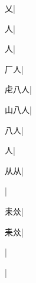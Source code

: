 \begin{multicols}{2}
{{乂}\mktsJzrVerticalBar{}{\cjk{}{\cnsym{}　}{\cnsym{}　}{\cnsym{}　}}|{}\par
{人}\mktsJzrVerticalBar{}{\cjk{}{\cnsym{}　}{\cnsym{}　}{\cnsym{}　}}|{}\par
{人}\mktsJzrVerticalBar{}{\cjk{}{\cnsym{}　}{\cnsym{}　}{\cnsym{}　}}|{}\par
{\cjk{}{\cnsym{}　}厂人}\mktsJzrVerticalBar{}{\cjk{}{\cnsym{}　}{\cnsym{}　}{\cnsym{}　}}|{}\par
{\cjk{}虍八人}\mktsJzrVerticalBar{}{\cjk{}{\cnsym{}　}{\cnsym{}　}{\cnsym{}　}}|{}\par
{\cjk{}山八人}\mktsJzrVerticalBar{}{\cjk{}{\cnsym{}　}{\cnsym{}　}{\cnsym{}　}}|{}\par
{八人}\mktsJzrVerticalBar{}{\cjk{}{\cnsym{}　}{\cnsym{}　}{\cnsym{}　}}|{}\par
{人}\mktsJzrVerticalBar{}{\cjk{}{\cnsym{}　}{\cnsym{}　}{\cnsym{}　}}|{}\par
{从从}\mktsJzrVerticalBar{}{\cjk{}{\cnsym{}　}{\cnsym{}　}{\cnsym{}　}}|{}\par
{}\mktsJzrVerticalBar{}{\cjk{}{\cnsym{}　}{\cnsym{}　}{\cnsym{}　}}|{}\par
{\cjk{}{\cnsym{}　}耒{\cnxb{}𠈌}}\mktsJzrVerticalBar{}{\cjk{}{\cnsym{}　}{\cnsym{}　}{\cnsym{}　}}|{}\par
{耒{\cnxb{}𠈌}}\mktsJzrVerticalBar{}{\cjk{}{\cnsym{}　}{\cnsym{}　}{\cnsym{}　}}|{}\par
{}\mktsJzrVerticalBar{}{\cjk{}{\cnsym{}　}{\cnsym{}　}{\cnsym{}　}}|{}\par
{}\mktsJzrVerticalBar{}{\cjk{}{\cnsym{}　}{\cnsym{}　}{\cnsym{}　}}|{}\par
}
\end{multicols}
